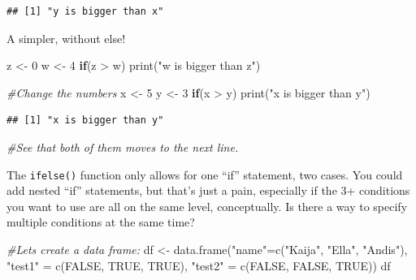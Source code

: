 \documentclass[
]{book}
\newenvironment{Shaded}{\begin{snugshade}}{\end{snugshade}}
\newcommand{\CommentTok}[1]{\textcolor[rgb]{0.56,0.35,0.01}{\textit{#1}}}
\newcommand{\ConstantTok}[1]{\textcolor[rgb]{0.00,0.00,0.00}{#1}}
\newcommand{\ControlFlowTok}[1]{\textcolor[rgb]{0.13,0.29,0.53}{\textbf{#1}}}
\newcommand{\DecValTok}[1]{\textcolor[rgb]{0.00,0.00,0.81}{#1}}
\newcommand{\FunctionTok}[1]{\textcolor[rgb]{0.00,0.00,0.00}{#1}}
\newcommand{\NormalTok}[1]{#1}
\newcommand{\OtherTok}[1]{\textcolor[rgb]{0.56,0.35,0.01}{#1}}
\newcommand{\SpecialCharTok}[1]{\textcolor[rgb]{0.00,0.00,0.00}{#1}}
\newcommand{\StringTok}[1]{\textcolor[rgb]{0.31,0.60,0.02}{#1}}
\theoremstyle{definition}
\theoremstyle{definition}
\theoremstyle{definition}
\theoremstyle{definition}
\theoremstyle{remark}
\begin{document}
\begin{verbatim}
## [1] "y is bigger than x"
\end{verbatim}

A simpler, without else!

\begin{Shaded}
\begin{Highlighting}[]
\NormalTok{z }\OtherTok{\textless{}{-}} \DecValTok{0}
\NormalTok{w }\OtherTok{\textless{}{-}} \DecValTok{4}
\ControlFlowTok{if}\NormalTok{(z }\SpecialCharTok{\textgreater{}}\NormalTok{ w) }\FunctionTok{print}\NormalTok{(}\StringTok{"w is bigger than z"}\NormalTok{)}

\CommentTok{\#Change the numbers}
\NormalTok{x }\OtherTok{\textless{}{-}} \DecValTok{5}
\NormalTok{y }\OtherTok{\textless{}{-}} \DecValTok{3}
\ControlFlowTok{if}\NormalTok{(x }\SpecialCharTok{\textgreater{}}\NormalTok{ y) }\FunctionTok{print}\NormalTok{(}\StringTok{"x is bigger than y"}\NormalTok{)}
\end{Highlighting}
\end{Shaded}

\begin{verbatim}
## [1] "x is bigger than y"
\end{verbatim}

\begin{Shaded}
\begin{Highlighting}[]
\CommentTok{\#See that both of them moves to the next line.}
\end{Highlighting}
\end{Shaded}

The \texttt{ifelse()} function only allows for one ``if'' statement, two cases. You could add nested ``if'' statements, but that's just a pain, especially if the 3+ conditions you want to use are all on the same level, conceptually. Is there a way to specify multiple conditions at the same time?

\begin{Shaded}
\begin{Highlighting}[]
\CommentTok{\#Let\textquotesingle{}s create a data frame:}
\NormalTok{df }\OtherTok{\textless{}{-}} \FunctionTok{data.frame}\NormalTok{(}\StringTok{"name"}\OtherTok{=}\FunctionTok{c}\NormalTok{(}\StringTok{"Kaija"}\NormalTok{, }\StringTok{"Ella"}\NormalTok{, }\StringTok{"Andis"}\NormalTok{), }\StringTok{"test1"} \OtherTok{=} \FunctionTok{c}\NormalTok{(}\ConstantTok{FALSE}\NormalTok{, }\ConstantTok{TRUE}\NormalTok{, }\ConstantTok{TRUE}\NormalTok{),}
                 \StringTok{"test2"} \OtherTok{=} \FunctionTok{c}\NormalTok{(}\ConstantTok{FALSE}\NormalTok{, }\ConstantTok{FALSE}\NormalTok{, }\ConstantTok{TRUE}\NormalTok{))}
\NormalTok{df}
\end{Highlighting}
\end{Shaded}
\end{document}
